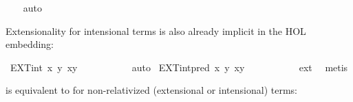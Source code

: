 \begin{isabellebody}
%
\isadelimproof
\ \ %
\endisadelimproof
%
\isatagproof
{}\isamarkupfalse%
\ auto%
\endisatagproof
{\isafoldproof}%
%
\isadelimproof
%
\endisadelimproof
%
\begin{isamarkuptext}%
Extensionality for intensional terms is also already implicit in the HOL embedding:%
\end{isamarkuptext}\isamarkuptrue%
\isamarkupfalse%
\ EXT{\isacharunderscore}int{\isacharcolon}\ {\isachardoublequoteopen}{\isasymlfloor}{\isacharparenleft}{\isasymlambda}x{\isachardot}\ {\isacharparenleft}{\isacharparenleft}{\isasymlambda}y{\isachardot}\ x\isactrlbold {\isasymapprox}y{\isacharparenright}\ \isactrlbold {\isasymdownharpoonleft}{\isacharparenleft}{\isasymalpha}{\isacharcolon}{\isacharcolon}{\isasymup}{\isasymzero}\ {\isacharparenright}{\isacharparenright}{\isacharparenright}\ \ \isactrlbold {\isasymdownharpoonleft}{\isacharparenleft}{\isasymbeta}{\isacharcolon}{\isacharcolon}{\isasymup}{\isasymzero}{\isacharparenright}{\isasymrfloor}\ {\isasymlongrightarrow}\ {\isasymalpha}\ {\isacharequal}\ {\isasymbeta}{\isachardoublequoteclose}%
\isadelimproof
\ %
\endisadelimproof
%
\isatagproof
{}\isamarkupfalse%
\ auto%
\endisatagproof
{\isafoldproof}%
%
\isadelimproof
%
\endisadelimproof
\isanewline
{}\isamarkupfalse%
\ EXT{\isacharunderscore}int{\isacharunderscore}pred{\isacharcolon}\ {\isachardoublequoteopen}{\isasymlfloor}{\isacharparenleft}{\isasymlambda}x{\isachardot}\ {\isacharparenleft}{\isacharparenleft}{\isasymlambda}y{\isachardot}\ x\isactrlbold {\isasymapprox}y{\isacharparenright}\ \isactrlbold {\isasymdown}{\isacharparenleft}{\isasymalpha}{\isacharcolon}{\isacharcolon}{\isasymup}{\isasymlangle}{\isasymzero}{\isasymrangle}{\isacharparenright}{\isacharparenright}{\isacharparenright}\ \isactrlbold {\isasymdown}{\isacharparenleft}{\isasymbeta}{\isacharcolon}{\isacharcolon}{\isasymup}{\isasymlangle}{\isasymzero}{\isasymrangle}{\isacharparenright}{\isasymrfloor}\ {\isasymlongrightarrow}\ {\isasymalpha}\ {\isacharequal}\ {\isasymbeta}{\isachardoublequoteclose}\ \isanewline
%
\isadelimproof
\ \ %
\endisadelimproof
%
\isatagproof
{}\isamarkupfalse%
\ ext\ \isamarkupfalse%
\ metis%
\endisatagproof
{\isafoldproof}%
%
\isadelimproof
%
\endisadelimproof
%
\isamarkuptrue%
%
\begin{isamarkuptext}%
 is equivalent to  for non-relativized (extensional or intensional) terms:%
\end{isamarkuptext}\isamarkuptrue%

\end{isabellebody}
